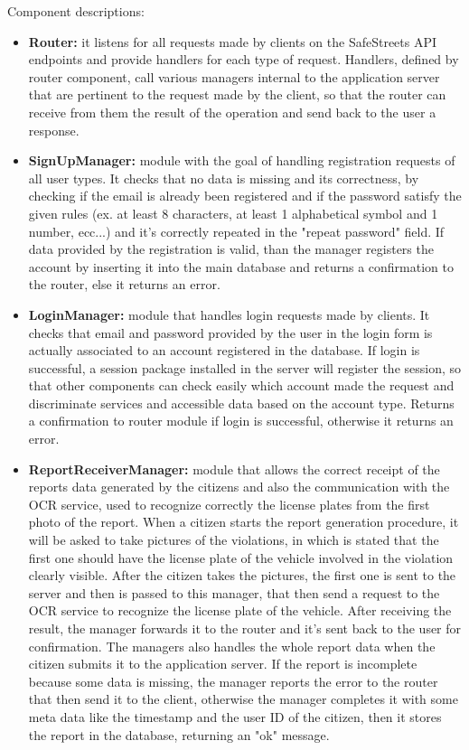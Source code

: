 \bigskip
Component descriptions:
\begin{itemize}
	\item \textbf{Router:} 
	it listens for all requests made by clients on the SafeStreets API endpoints and provide handlers for each type of request. Handlers, defined by router component, call various managers internal to the application server that are pertinent to the request made by the client, so that the router can receive from them the result of the operation and send back to the user a response.
	\item \textbf{SignUpManager:}
	module with the goal of handling registration requests of all user types. It checks that no data is missing and its correctness, by checking if the email is already been registered and if the password satisfy the given rules (ex. at least 8 characters, at least 1 alphabetical symbol and 1 number, ecc...) and it's correctly repeated in the "repeat password" field. If data provided by the registration is valid, than the manager registers the account by inserting it into the main database and returns a confirmation to the router, else it returns an error.
	\item \textbf{LoginManager:}
	module that handles login requests made by clients. It checks that email and password provided by the user in the login form is actually associated to an account registered in the database. If login is successful, a session package installed in the server will register the session, so that other components can check easily which account made the request and discriminate services and accessible data based on the account type. Returns a confirmation to router module if login is successful, otherwise it returns an error.
	\item \textbf{ReportReceiverManager:}
	module that allows the correct receipt of the reports data generated by the citizens and also the communication with the OCR service, used to recognize correctly the license plates from the first photo of the report. When a citizen starts the report generation procedure, it will be asked to take pictures of the violations, in which is stated that the first one should have the license plate of the vehicle involved in the violation clearly visible. After the citizen takes the pictures, the first one is sent to the server and then is passed to this manager, that then send a request to the OCR service to recognize the license plate of the vehicle. After receiving the result, the manager forwards it to the router and it's sent back to the user for confirmation. The managers also handles the whole report data when the citizen submits it to the application server. If the report is incomplete because some data is missing, the manager reports the error to the router that then send it to the client, otherwise the manager completes it with some meta data like the timestamp and the user ID of the citizen, then it stores the report in the database, returning an "ok" message.

\end{itemize}
